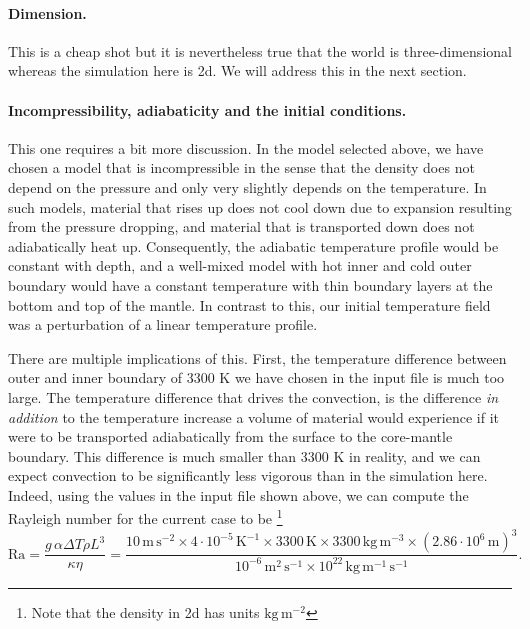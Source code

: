 \documentclass{article}
\begin{document}
\paragraph{Dimension.} This is a cheap shot but it is nevertheless true that the
world is three-dimensional whereas the simulation here is 2d. We will address
this in the next section.

\paragraph{Incompressibility, adiabaticity and the initial conditions.} This one
requires a bit more discussion. In the model selected above, we have chosen a
model that is incompressible in the sense that the density does not depend on
the pressure and only very slightly depends on the temperature. 
In such models, material that rises up does not cool down due to
expansion resulting from the pressure dropping, and material that is transported
down does not adiabatically heat up. Consequently, the adiabatic temperature
profile would be constant with depth, and a well-mixed model with hot inner and
cold outer boundary would have a constant temperature with thin boundary layers
at the bottom and top of the mantle. In contrast to this, our initial
temperature field was a perturbation of a linear temperature profile.

There are multiple implications of this. First, the temperature difference
between outer and inner boundary of 3300 K we have chosen in the input file is
much too large. The temperature difference that drives the convection, 
is the difference \textit{in addition} to the temperature increase a volume of 
material would experience if it were to be
transported adiabatically from the surface to the core-mantle boundary. This
difference is much smaller than 3300 K in reality, and we can expect convection
to be significantly less vigorous than in the simulation here. Indeed, using
the values in the input file shown above, we can compute the Rayleigh number for
the current case to be%
\footnote{Note that the density in 2d has units $\text{kg}\,\text{m}^{-2}$}
\begin{equation*}
  \textrm{Ra}
  =
  \frac{g\, \alpha  \Delta T  \rho  L^3}{\kappa\eta}
=
  \frac{10\, \text{m}\,\text{s}^{-2} \times 4\cdot 10^{-5}\, \text{K}^{-1} \times 3300\,
  \text{K} \times 3300\, \text{kg}\,\text{m}^{-3} \times (2.86 \cdot 10^6
  \, \text{m})^3}{10^{-6}\, \text{m}^2\,\text{s}^{-1}\times 10^{22}\,
  \text{kg}\,\text{m}^{-1}\,\text{s}^{-1}}.
\end{equation*}
\end{document}
